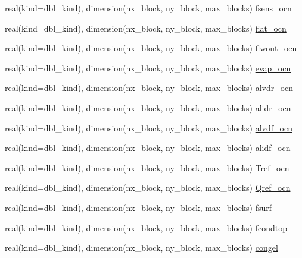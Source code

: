 \begin{DoxyCompactItemize}
\item 
real(kind=dbl\_\-kind), dimension(nx\_\-block, ny\_\-block, max\_\-blocks) \hyperlink{namespaceice__flux_aa2a8953e1c37a1f09551ac626a62263b}{fsens\_\-ocn}
\item 
real(kind=dbl\_\-kind), dimension(nx\_\-block, ny\_\-block, max\_\-blocks) \hyperlink{namespaceice__flux_aa7641984ea4c796e511a25d93fd3b86f}{flat\_\-ocn}
\item 
real(kind=dbl\_\-kind), dimension(nx\_\-block, ny\_\-block, max\_\-blocks) \hyperlink{namespaceice__flux_a0242ff7a5b643169198472b59e49cfa7}{flwout\_\-ocn}
\item 
real(kind=dbl\_\-kind), dimension(nx\_\-block, ny\_\-block, max\_\-blocks) \hyperlink{namespaceice__flux_adea597318ddb4be7d507f86cc3b48f05}{evap\_\-ocn}
\item 
real(kind=dbl\_\-kind), dimension(nx\_\-block, ny\_\-block, max\_\-blocks) \hyperlink{namespaceice__flux_a0d5c384f44be34217703bef2e23ebdc6}{alvdr\_\-ocn}
\item 
real(kind=dbl\_\-kind), dimension(nx\_\-block, ny\_\-block, max\_\-blocks) \hyperlink{namespaceice__flux_a28770e51f25a00f4a215c889264041b8}{alidr\_\-ocn}
\item 
real(kind=dbl\_\-kind), dimension(nx\_\-block, ny\_\-block, max\_\-blocks) \hyperlink{namespaceice__flux_a3060ba0c930f8b0676cfc2a6af612769}{alvdf\_\-ocn}
\item 
real(kind=dbl\_\-kind), dimension(nx\_\-block, ny\_\-block, max\_\-blocks) \hyperlink{namespaceice__flux_a9d1893a1b54339b70d7119c4c03163c8}{alidf\_\-ocn}
\item 
real(kind=dbl\_\-kind), dimension(nx\_\-block, ny\_\-block, max\_\-blocks) \hyperlink{namespaceice__flux_af9f2e55cc441e661ab391bd3c4640ce4}{Tref\_\-ocn}
\item 
real(kind=dbl\_\-kind), dimension(nx\_\-block, ny\_\-block, max\_\-blocks) \hyperlink{namespaceice__flux_afece1d3107dcbd97234912ff91e89d8b}{Qref\_\-ocn}
\item 
real(kind=dbl\_\-kind), dimension(nx\_\-block, ny\_\-block, max\_\-blocks) \hyperlink{namespaceice__flux_a27dbd3d1fc36c0ddb4c39c806d935775}{fsurf}
\item 
real(kind=dbl\_\-kind), dimension(nx\_\-block, ny\_\-block, max\_\-blocks) \hyperlink{namespaceice__flux_a0ba73c84e3792cf8704a33f6d95e7f95}{fcondtop}
\item 
real(kind=dbl\_\-kind), dimension(nx\_\-block, ny\_\-block, max\_\-blocks) \hyperlink{namespaceice__flux_acb44c9e01061e258c35b8dbadf412741}{congel}
\item 

\end{DoxyCompactItemize}
